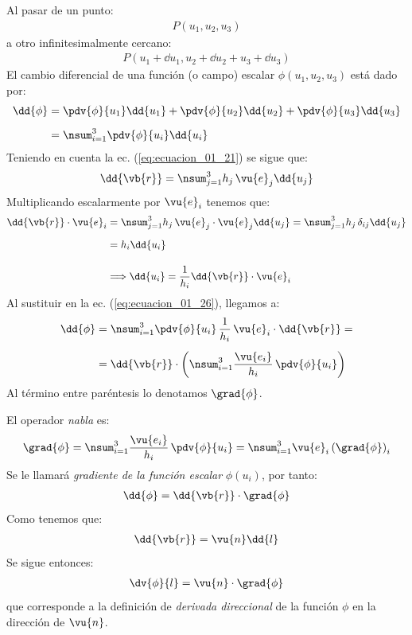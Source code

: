 Al pasar de un punto:
\begin{align*}
P (u_{1}, u_{2}, u_{3})
\end{align*}
a otro infinitesimalmente cercano:
\begin{align*}
P (u_{1} + \dd{u}_{1}, u_{2} + \dd{u_{2}} + u_{3} + \dd{u_{3}})
\end{align*}
El cambio diferencial de una función (o campo) escalar $\phi(u_{1}, u_{2}, u_{3})$ está dado por:
\begin{align}
\begin{aligned}
\dd{\phi} &= \pdv{\phi}{u_{1}} \dd{u_{1}} + \pdv{\phi}{u_{2}} \dd{u_{2}} + \pdv{\phi}{u_{3}} \dd{u_{3}} \\[0.5em]
&= \nsum_{i=1}^{3} \pdv{\phi}{u_{i}} \dd{u_{i}}
\end{aligned}
\label{eq:ecuacion_01_26}
\end{align}
Teniendo en cuenta la ec. (\ref{eq:ecuacion_01_21}) se sigue que:
\begin{align}
\dd{\vb{r}} = \nsum_{j=1}^{3} h_{j} \, \vu{e}_{j} \dd{u_{j}}
\label{eq:ecuacion_01_27}
\end{align}
Multiplicando escalarmente por $\vu{e}_{i}$ tenemos que:
\begin{align*}
\dd{\vb{r}} \cdot \vu{e}_{i} &= \nsum_{j=1}^{3} h_{j} \, \vu{e}_{j} \cdot \vu{e}_{j} \dd{u_{j}} = \nsum_{j=1}^{3} h_{j} \, \delta_{ij} \dd{u_{j}} \\[0.5em]
&= h_{i} \dd{u_{i}} \\[1em]
&\Longrightarrow \dd{u_{i}} = \dfrac{1}{h_{i}} \dd{\vb{r}} \cdot \vu{e}_{i}
\end{align*}
Al sustituir en la ec. (\ref{eq:ecuacion_01_26}), llegamos a:
\begin{align*}
\dd{\phi} &= \nsum_{i=1}^{3} \pdv{\phi}{u_{i}} \, \dfrac{1}{h_{i}} \, \vu{e}_{i} \cdot \dd{\vb{r}} = \\[0.5em]
&= \dd{\vb{r}} \cdot \left( \nsum_{i=1}^{3} \dfrac{\vu{e_{i}}}{h_{i}} \, \pdv{\phi}{u_{i}} \right)
\end{align*}
Al término entre paréntesis lo denotamos $\grad{\phi}$.
\par
El operador \emph{nabla} es:
\begin{align}
\grad{\phi} = \nsum_{i=1}^{3} \dfrac{\vu{e_{i}}}{h_{i}} \, \pdv{\phi}{u_{i}} = \nsum_{i=1}^{3} \vu{e}_{i} \left( \grad{\phi} \right)_{i}
\label{eq:ecuacion_01_28}
\end{align}
Se le llamará \emph{gradiente de la función escalar} $\phi(u_{i})$, por tanto:
\begin{align}
\dd{\phi} = \dd{\vb{r}} \cdot \grad{\phi}
\label{eq:ecuacion_01_29}
\end{align}
Como tenemos que:
\begin{align*}
\dd{\vb{r}} = \vu{n} \dd{l}
\end{align*}
Se sigue entonces:
\begin{align*}
\dv{\phi}{l} = \vu{n} \cdot \grad{\phi}
\end{align*}
que corresponde a la definición de \emph{derivada direccional} de la función $\phi$ en la dirección de $\vu{n}$.

